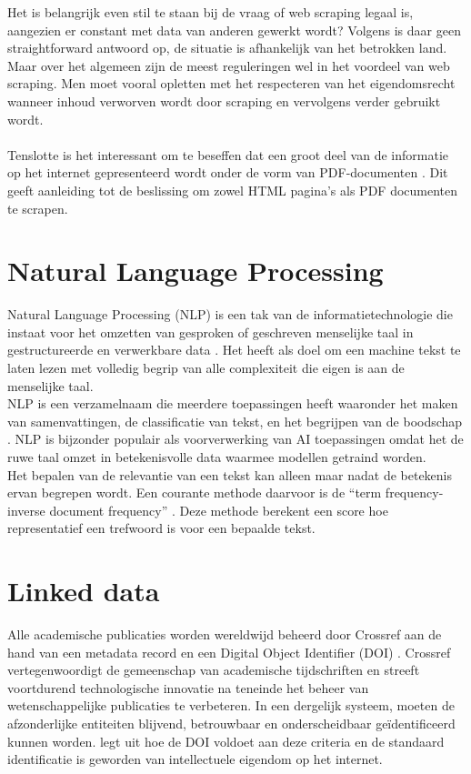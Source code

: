 Het is belangrijk even stil te staan bij de vraag of web scraping legaal is, aangezien er constant met data van anderen gewerkt wordt? Volgens \textcite{EPSI2015} is daar geen straightforward antwoord op, de situatie is afhankelijk van het betrokken land. Maar over het algemeen zijn de meest reguleringen wel in het voordeel van web scraping. Men moet vooral opletten met het respecteren van het eigendomsrecht wanneer inhoud verworven wordt door scraping en vervolgens verder gebruikt wordt.\\\\
Tenslotte is het interessant om te beseffen dat een groot deel van de informatie op het internet gepresenteerd wordt onder de vorm van PDF-documenten \autocite{Singrodia2019}. Dit geeft aanleiding tot de beslissing om zowel HTML pagina's als PDF documenten te scrapen.\\
\section{Natural Language Processing}
Natural Language Processing (NLP) is een tak van de informatietechnologie die instaat voor het omzetten van gesproken of geschreven menselijke taal in gestructureerde en verwerkbare data \autocite{Fanni2023}.
Het heeft als doel om een machine tekst te laten lezen met volledig begrip van alle complexiteit die eigen is aan de menselijke taal.\\
NLP is een verzamelnaam die meerdere toepassingen heeft waaronder het maken van samenvattingen, de classificatie van tekst, en het begrijpen van de boodschap \autocite{Khurana2022}. NLP is bijzonder populair als voorverwerking van AI toepassingen omdat het de ruwe taal omzet in betekenisvolle data waarmee modellen getraind worden.\\
Het bepalen van de relevantie van een tekst kan alleen maar nadat de betekenis ervan begrepen wordt. Een courante methode daarvoor is de ``term frequency-inverse document frequency'' \autocite{Havrlant2017}. Deze methode berekent een score hoe representatief een trefwoord is voor een bepaalde tekst. 
\section{Linked data}
Alle academische publicaties worden wereldwijd beheerd door Crossref aan de hand van een metadata record en een Digital Object Identifier (DOI) \autocite{Hendricks2020}. Crossref vertegenwoordigt de gemeenschap van academische tijdschriften en streeft voortdurend technologische innovatie na teneinde het beheer van wetenschappelijke publicaties te verbeteren.
In een dergelijk systeem, moeten de afzonderlijke entiteiten blijvend, betrouwbaar en onderscheidbaar geïdentificeerd kunnen worden. \textcite{Chandrakar2006} legt uit hoe de DOI voldoet aan deze criteria en de standaard identificatie is geworden van intellectuele eigendom op het internet.

